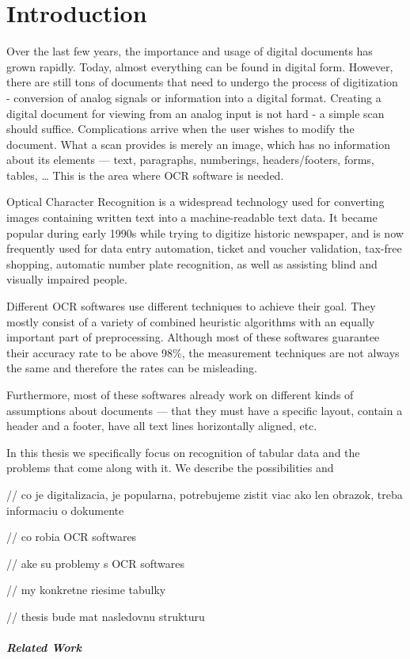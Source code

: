 \chapter*{Introduction}

Over the last few years, the importance and usage of digital documents has grown rapidly. Today, almost everything can be found in digital form. However, there are still tons of documents that need to undergo the process of digitization - conversion of analog signals or information into a digital format. Creating a digital document for viewing from an analog input is not hard - a simple scan should suffice. Complications arrive when the user wishes to modify the document. What a scan provides is merely an image, which has no information about its elements --- text, paragraphs, numberings, headers/footers, forms, tables, \dots {} This is the area where OCR software is needed.

Optical Character Recognition is a widespread technology used for converting images containing written text into a machine-readable text data. It became popular during early 1990s while trying to digitize historic newspaper, and is now frequently used for data entry automation, ticket and voucher validation, tax-free shopping, automatic number plate recognition, as well as assisting blind and visually impaired people.

Different OCR softwares use different techniques to achieve their goal. They mostly consist of a variety of combined heuristic algorithms with an equally important part of preprocessing. Although most of these softwares guarantee  their accuracy rate to be above 98\%, the measurement techniques are not always the same and therefore the rates can be misleading.

Furthermore, most of these softwares already work on different kinds of assumptions about documents --- that they must have a specific layout, contain a header and a footer, have all text lines horizontally aligned, etc.

In this thesis we specifically focus on recognition of tabular data and the problems that come along with it. We describe the possibilities and 



// co je digitalizacia, je popularna, potrebujeme zistit viac ako len obrazok, treba informaciu o dokumente


// co robia OCR softwares


// ake su problemy s OCR softwares


// my konkretne riesime tabulky


// thesis bude mat nasledovnu strukturu


\paragraph{Related Work}


